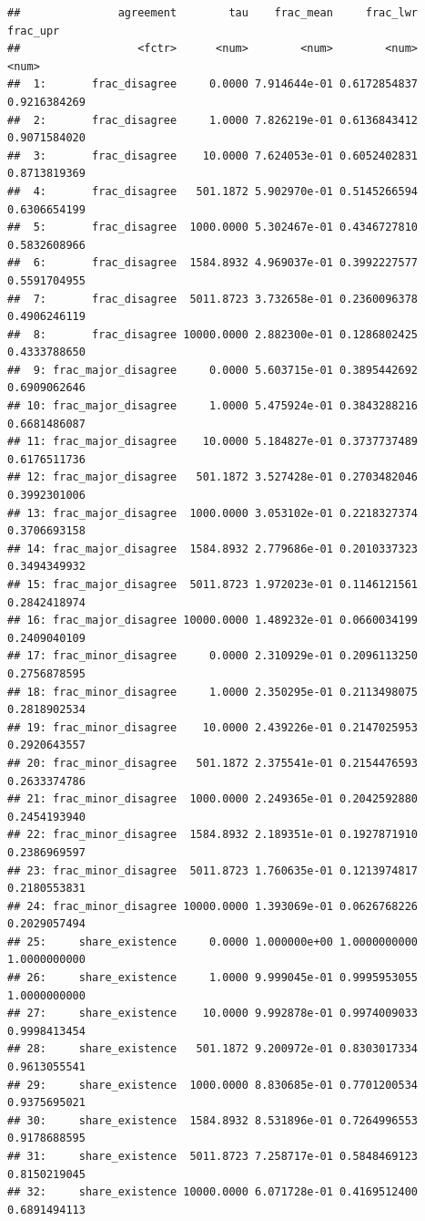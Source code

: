 \documentclass[
  11pt,
]{article}
\begin{document}
\begin{verbatim}
##               agreement        tau    frac_mean     frac_lwr     frac_upr
##                  <fctr>      <num>        <num>        <num>        <num>
##  1:       frac_disagree     0.0000 7.914644e-01 0.6172854837 0.9216384269
##  2:       frac_disagree     1.0000 7.826219e-01 0.6136843412 0.9071584020
##  3:       frac_disagree    10.0000 7.624053e-01 0.6052402831 0.8713819369
##  4:       frac_disagree   501.1872 5.902970e-01 0.5145266594 0.6306654199
##  5:       frac_disagree  1000.0000 5.302467e-01 0.4346727810 0.5832608966
##  6:       frac_disagree  1584.8932 4.969037e-01 0.3992227577 0.5591704955
##  7:       frac_disagree  5011.8723 3.732658e-01 0.2360096378 0.4906246119
##  8:       frac_disagree 10000.0000 2.882300e-01 0.1286802425 0.4333788650
##  9: frac_major_disagree     0.0000 5.603715e-01 0.3895442692 0.6909062646
## 10: frac_major_disagree     1.0000 5.475924e-01 0.3843288216 0.6681486087
## 11: frac_major_disagree    10.0000 5.184827e-01 0.3737737489 0.6176511736
## 12: frac_major_disagree   501.1872 3.527428e-01 0.2703482046 0.3992301006
## 13: frac_major_disagree  1000.0000 3.053102e-01 0.2218327374 0.3706693158
## 14: frac_major_disagree  1584.8932 2.779686e-01 0.2010337323 0.3494349932
## 15: frac_major_disagree  5011.8723 1.972023e-01 0.1146121561 0.2842418974
## 16: frac_major_disagree 10000.0000 1.489232e-01 0.0660034199 0.2409040109
## 17: frac_minor_disagree     0.0000 2.310929e-01 0.2096113250 0.2756878595
## 18: frac_minor_disagree     1.0000 2.350295e-01 0.2113498075 0.2818902534
## 19: frac_minor_disagree    10.0000 2.439226e-01 0.2147025953 0.2920643557
## 20: frac_minor_disagree   501.1872 2.375541e-01 0.2154476593 0.2633374786
## 21: frac_minor_disagree  1000.0000 2.249365e-01 0.2042592880 0.2454193940
## 22: frac_minor_disagree  1584.8932 2.189351e-01 0.1927871910 0.2386969597
## 23: frac_minor_disagree  5011.8723 1.760635e-01 0.1213974817 0.2180553831
## 24: frac_minor_disagree 10000.0000 1.393069e-01 0.0626768226 0.2029057494
## 25:     share_existence     0.0000 1.000000e+00 1.0000000000 1.0000000000
## 26:     share_existence     1.0000 9.999045e-01 0.9995953055 1.0000000000
## 27:     share_existence    10.0000 9.992878e-01 0.9974009033 0.9998413454
## 28:     share_existence   501.1872 9.200972e-01 0.8303017334 0.9613055541
## 29:     share_existence  1000.0000 8.830685e-01 0.7701200534 0.9375695021
## 30:     share_existence  1584.8932 8.531896e-01 0.7264996553 0.9178688595
## 31:     share_existence  5011.8723 7.258717e-01 0.5848469123 0.8150219045
## 32:     share_existence 10000.0000 6.071728e-01 0.4169512400 0.6891494113

\end{verbatim}
\end{document}
